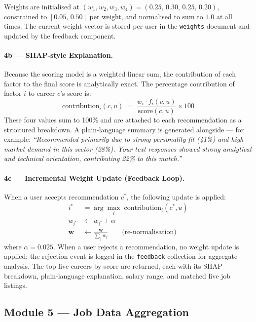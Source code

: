 Weights are initialised at $(w_1, w_2, w_3, w_4) = (0.25,\,0.30,\,0.25,\,0.20)$,
constrained to $[0.05,\,0.50]$ per weight, and normalised to sum to $1.0$ at
all times. The current weight vector is stored per user in the \texttt{weights}
document and updated by the feedback component.

\paragraph{4b --- SHAP-style Explanation.}
Because the scoring model is a weighted linear sum, the contribution of each
factor to the final score is analytically exact. The percentage contribution
of factor $i$ to career $c$'s score is:
%
\begin{equation}
  \text{contribution}_i(c, u)
  \;=\;
  \frac{w_i \cdot f_i(c, u)}{\text{score}(c, u)} \times 100
  \label{eq:shap}
\end{equation}
%
These four values sum to 100\% and are attached to each recommendation as a
structured breakdown. A plain-language summary is generated alongside ---
for example: \emph{``Recommended primarily due to strong personality fit
(41\%) and high market demand in this sector (28\%). Your text responses
showed strong analytical and technical orientation, contributing 22\% to
this match.''}

\paragraph{4c --- Incremental Weight Update (Feedback Loop).}
When a user accepts recommendation $c^*$, the following update is applied:
%
\begin{align}
  i^* &= \arg\max_i\; \text{contribution}_i(c^*, u)
  \label{eq:argmax}\\
  w_{i^*} &\leftarrow w_{i^*} + \alpha
  \label{eq:update}\\
  \mathbf{w} &\leftarrow \frac{\mathbf{w}}{\sum_j w_j}
  \qquad \text{(re-normalisation)}
  \label{eq:renorm}
\end{align}
%
where $\alpha = 0.025$. When a user rejects a recommendation, no weight update
is applied; the rejection event is logged in the \texttt{feedback} collection
for aggregate analysis. The top five careers by score are returned, each with
its SHAP breakdown, plain-language explanation, salary range, and matched live
job listings.

\subsection*{Module 5 --- Job Data Aggregation}

